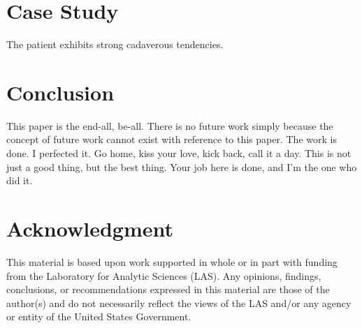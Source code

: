 \documentclass[conference]{IEEEtran}
\begin{document}
\section{Case Study}
The patient exhibits strong cadaverous tendencies.

\section{Conclusion}
This paper is the end-all, be-all. There is no future work simply because the concept of future work cannot exist with reference to this paper. The work is done. I perfected it. Go home, kiss your love, kick back, call it a day. This is not just a good thing, but the best thing. Your job here is done, and I'm the one who did it. 




\section*{Acknowledgment}
This material is based upon work supported in whole or in part with funding from the Laboratory for Analytic Sciences (LAS). Any opinions, findings, conclusions, or recommendations expressed in this material are those of the author(s) and do not necessarily reflect the views of the LAS and/or any agency or entity of the United States Government.


%
%
%




\end{document}
